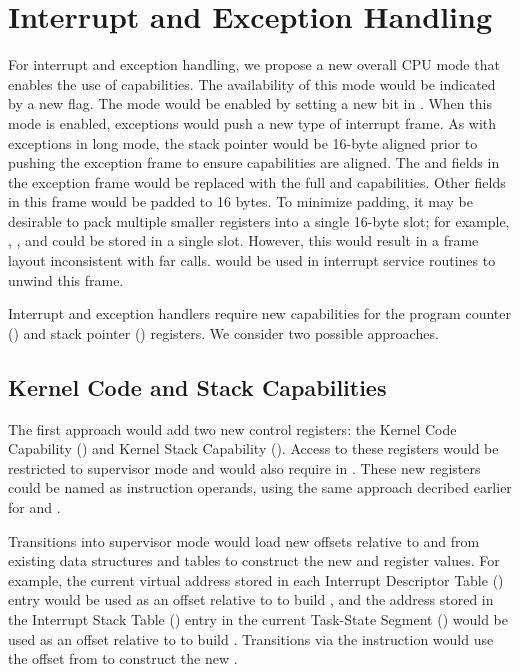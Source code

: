 \section{Interrupt and Exception Handling}
\label{sec:x86:interrupt-exception}

For interrupt and exception handling, we propose a new overall CPU
mode that enables the use of capabilities.  The availability of this
mode would be indicated by a new  flag.  The mode
would be enabled by setting a new bit in \CRFOUR{}.  When this mode is
enabled, exceptions would push a new type of interrupt frame.  As with
exceptions in long mode, the stack pointer would be 16-byte aligned
prior to pushing the exception frame to ensure capabilities are
aligned.  The \RIP{} and \RSP{} fields in the exception frame would be
replaced with the full \CIP{} and \CSP{} capabilities.  Other fields
in this frame would be padded to 16 bytes.  To minimize padding, it
may be desirable to pack multiple smaller registers into a single
16-byte slot; for example, \SS{}, \CS{}, and \RFLAGS{} could be stored
in a single slot.  However, this would result in a frame layout
inconsistent with far calls.   would be used in
interrupt service routines to unwind this frame.

Interrupt and exception handlers require new capabilities for the
program counter (\CIP{}) and stack pointer (\CSP{}) registers.  We consider
two possible approaches.

\subsection{Kernel Code and Stack Capabilities}

The first approach would add two new control registers: the Kernel
Code Capability (\KCC{}) and Kernel Stack Capability (\KSC{}).  Access to
these registers would be restricted to supervisor mode and would also
require \cappermASR{} in \CIP{}.  These new registers
could be named as instruction operands, using the same approach decribed
earlier for \CFS{} and \CGS{}.

Transitions into
supervisor mode would load new offsets relative to \KCC{} and \KSC{} from
existing data structures and tables to construct the new \CIP{} and \CSP{}
register values.  For example, the current virtual address stored in
each Interrupt Descriptor Table (\IDT{}) entry would be used as an offset
relative to \KCC{} to build \CIP{}, and the address stored in the Interrupt
Stack Table (\IST{}) entry in the current Task-State Segment (\TSS{}) would
be used as an offset relative to \KSC{} to build \CSP{}.  Transitions via
the  instruction would use the offset from \LSTAR{} to
construct the new \CIP{}.

